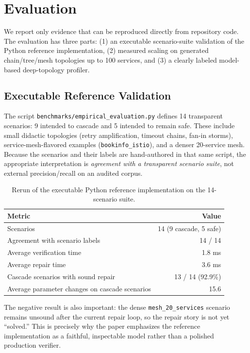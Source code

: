 \documentclass[10pt,twocolumn]{article}
\begin{document}
\section{Evaluation}
\label{sec:eval}

We report only evidence that can be reproduced directly from repository code.
The evaluation has three parts: (1) an executable scenario-suite validation of
the Python reference implementation, (2) measured scaling on generated
chain/tree/mesh topologies up to 100 services, and (3) a clearly labeled
model-based deep-topology profiler.

\subsection{Executable Reference Validation}

The script \texttt{benchmarks/empirical\_evaluation.py} defines 14 transparent
scenarios: 9 intended to cascade and 5 intended to remain safe.  These include
small didactic topologies (retry amplification, timeout chains, fan-in storms),
service-mesh-flavored examples (\texttt{bookinfo\_istio}), and a denser
20-service mesh.  Because the scenarios and their labels are hand-authored in
that same script, the appropriate interpretation is \emph{agreement with a
transparent scenario suite}, not external precision/recall on an audited
corpus.

\begin{table}[t]
\centering
\caption{Rerun of the executable Python reference implementation on the 14-scenario suite.}
\label{tab:scenario_suite}
\small
\begin{tabular}{@{}lr@{}}
\toprule
\textbf{Metric} & \textbf{Value} \\
\midrule
Scenarios & 14 (9 cascade, 5 safe) \\
Agreement with scenario labels & 14 / 14 \\
Average verification time & 1.8 ms \\
Average repair time & 3.6 ms \\
Cascade scenarios with sound repair & 13 / 14 (92.9\%) \\
Average parameter changes on cascade scenarios & 15.6 \\
\bottomrule
\end{tabular}
\end{table}

The negative result is also important: the dense
\texttt{mesh\_20\_services} scenario remains unsound after the current repair
loop, so the repair story is not yet ``solved.''  This is precisely why the
paper emphasizes the reference implementation as a faithful, inspectable model
rather than a polished production verifier.
\end{document}
